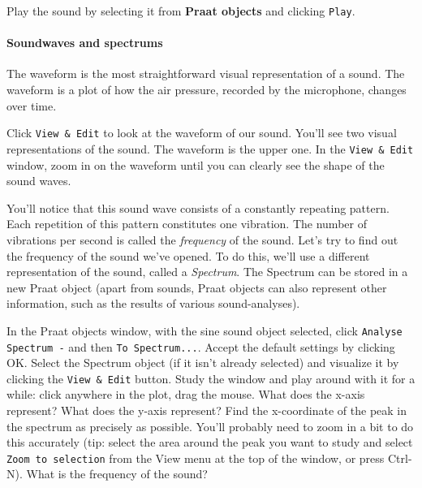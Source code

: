 \documentclass[a4paper, 9pt]{article}
\begin{document}
\begin{exercise}
\action Play the sound by selecting it from \textbf{Praat objects} and clicking \texttt{Play}.
\end{exercise}


\paragraph{Soundwaves and spectrums}\label{soundwaves-and-spectrums}

The waveform is the most straightforward visual representation of a sound. The waveform is a plot of how the air pressure, recorded by the microphone, changes over time.

\begin{exercise}
\action Click \texttt{View \& Edit} to look at the waveform of our sound.
You'll see two visual representations of the sound. The waveform is the
upper one.
\action In the \texttt{View \& Edit} window, zoom in on the waveform until you can clearly see the shape of the sound waves.
\end{exercise}

You'll notice that this sound wave consists of a constantly repeating
pattern. Each repetition of this pattern constitutes one vibration. The
number of vibrations per second is called the \emph{frequency} of the
sound.
Let's try to find out the frequency of the sound we've opened. To do
this, we'll use a different representation of the sound, called a
\emph{Spectrum}. The Spectrum can be stored in a new Praat object (apart
from sounds, Praat objects can also represent other information, such as
the results of various sound-analyses).

\begin{exercise}
\action In the Praat objects window, with the sine sound object selected, click \texttt{Analyse Spectrum -} and then \texttt{To Spectrum...}. Accept the default settings by clicking OK.
\action Select the Spectrum object (if it isn't already selected) and visualize it by clicking the \texttt{View \& Edit} button.
\action Study the window and play around with it for a while: click anywhere in the plot, drag the mouse. What does the x-axis represent? What does the y-axis represent?
\action Find the x-coordinate of the peak in the spectrum as precisely as possible. You'll probably need to zoom in a bit to do this accurately (tip: select the area around the peak you want to study and select \texttt{Zoom to selection} from the View menu at the top of the window, or press Ctrl-N). What is the frequency of the sound? 
\end{exercise}
\end{document}
